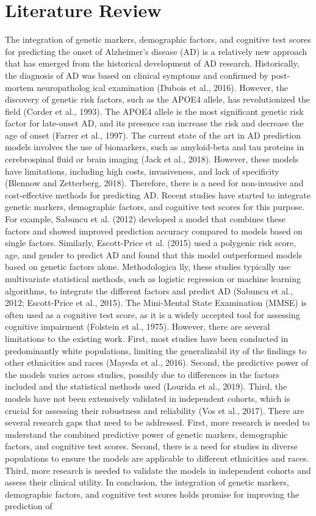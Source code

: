 \documentclass[conference]{IEEEtran}
\begin{document}
\section{Literature Review}
The integration of genetic markers, demographic factors, and cognitive test scores for predicting the onset of Alzheimer's disease (AD) is a relatively new approach that has emerged from the historical development of AD research. Historically, the diagnosis of AD was based on clinical symptoms and confirmed by post-mortem neuropatholog ical examination (Dubois et al., 2016). However, the discovery of genetic risk factors, such as the APOE4 allele, has revolutionized the field (Corder et al., 1993). The APOE4 allele is the most significant genetic risk factor for late-onset AD, and its presence can increase the risk and decrease the age of onset (Farrer et al., 1997). The current state of the art in AD prediction models involves the use of biomarkers, such as amyloid-beta and tau proteins in cerebrospinal fluid or brain imaging (Jack et al., 2018). However, these models have limitations, including high costs, invasiveness, and lack of specificity (Blennow and Zetterberg, 2018). Therefore, there is a need for non-invasive and cost-effective methods for predicting AD. Recent studies have started to integrate genetic markers, demographic factors, and cognitive test scores for this purpose. For example, Sabuncu et al. (2012) developed a model that combines these factors and showed improved prediction accuracy compared to models based on single factors. Similarly, Escott-Price et al. (2015) used a polygenic risk score, age, and gender to predict AD and found that this model outperformed models based on genetic factors alone. Methodologica lly, these studies typically use multivariate statistical methods, such as logistic regression or machine learning algorithms, to integrate the different factors and predict AD (Sabuncu et al., 2012; Escott-Price et al., 2015). The Mini-Mental State Examination (MMSE) is often used as a cognitive test score, as it is a widely accepted tool for assessing cognitive impairment (Folstein et al., 1975). However, there are several limitations to the existing work. First, most studies have been conducted in predominantly white populations, limiting the generalizabil ity of the findings to other ethnicities and races (Mayeda et al., 2016). Second, the predictive power of the models varies across studies, possibly due to differences in the factors included and the statistical methods used (Lourida et al., 2019). Third, the models have not been extensively validated in independent cohorts, which is crucial for assessing their robustness and reliability (Vos et al., 2017). There are several research gaps that need to be addressed. First, more research is needed to understand the combined predictive power of genetic markers, demographic factors, and cognitive test scores. Second, there is a need for studies in diverse populations to ensure the models are applicable to different ethnicities and races. Third, more research is needed to validate the models in independent cohorts and assess their clinical utility. In conclusion, the integration of genetic markers, demographic factors, and cognitive test scores holds promise for improving the prediction of 
\end{document}
